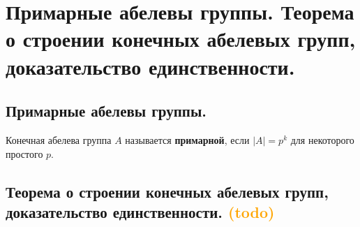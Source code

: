\section{Примарные абелевы группы. Теорема о строении конечных абелевых групп, доказательство единственности.}

\subsection{Примарные абелевы группы.}
\begin{definition}
    Конечная абелева группа $A$ называется \textbf{примарной}, если $|A| = p^k$ для некоторого простого $p$.
\end{definition}

\subsection{Теорема о строении конечных абелевых групп, доказательство единственности. \textcolor{orange}{(todo)}}